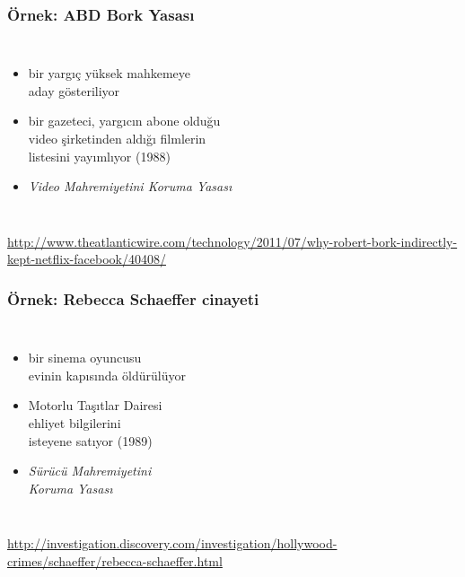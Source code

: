 \documentclass[dvipsnames]{beamer}
\theoremstyle{plain}
\begin{document}
\begin{frame}
  \frametitle{Örnek: ABD Bork Yasası}

  \begin{columns}

    \begin{itemize}
      \item bir yargıç yüksek mahkemeye\\
        aday gösteriliyor
      \item bir gazeteci, yargıcın abone olduğu\\
        video şirketinden aldığı filmlerin\\
        listesini yayımlıyor (1988)

      \medskip
      \item \emph{Video Mahremiyetini Koruma Yasası}
    \end{itemize}
  \end{columns}

  \medskip
  \tiny{\url{http://www.theatlanticwire.com/technology/2011/07/why-robert-bork-indirectly-kept-netflix-facebook/40408/}}\\
\end{frame}

\begin{frame}
  \frametitle{Örnek: Rebecca Schaeffer cinayeti}

  \begin{columns}

    \begin{itemize}
      \item bir sinema oyuncusu\\
        evinin kapısında öldürülüyor
      \item Motorlu Taşıtlar Dairesi\\
        ehliyet bilgilerini\\
        isteyene satıyor (1989)

      \medskip
      \item \emph{Sürücü Mahremiyetini\\
        Koruma Yasası}
    \end{itemize}
  \end{columns}

  \medskip
  \tiny{\url{http://investigation.discovery.com/investigation/hollywood-crimes/schaeffer/rebecca-schaeffer.html}}\\
\end{frame}
\end{document}
